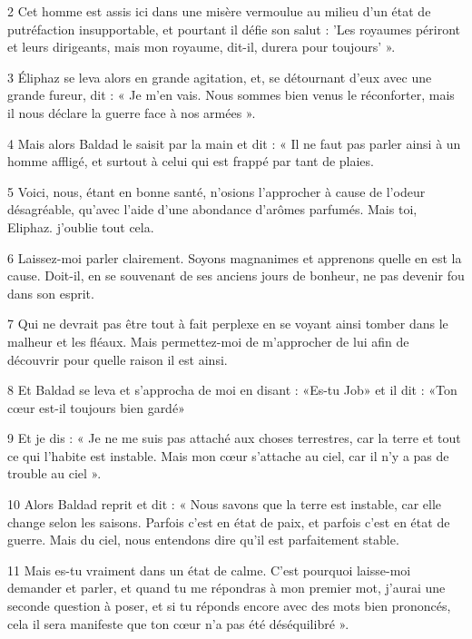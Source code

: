 \par 2 Cet homme est assis ici dans une misère vermoulue au milieu d'un état de putréfaction insupportable, et pourtant il défie son salut : 'Les royaumes périront et leurs dirigeants, mais mon royaume, dit-il, durera pour toujours' ».

\par 3 Éliphaz se leva alors en grande agitation, et, se détournant d'eux avec une grande fureur, dit : « Je m'en vais. Nous sommes bien venus le réconforter, mais il nous déclare la guerre face à nos armées ».

\par 4 Mais alors Baldad le saisit par la main et dit : « Il ne faut pas parler ainsi à un homme affligé, et surtout à celui qui est frappé par tant de plaies.

\par 5 Voici, nous, étant en bonne santé, n'osions l'approcher à cause de l'odeur désagréable, qu'avec l'aide d'une abondance d'arômes parfumés. Mais toi, Eliphaz. j’oublie tout cela.

\par 6 Laissez-moi parler clairement. Soyons magnanimes et apprenons quelle en est la cause. Doit-il, en se souvenant de ses anciens jours de bonheur, ne pas devenir fou dans son esprit.

\par 7 Qui ne devrait pas être tout à fait perplexe en se voyant ainsi tomber dans le malheur et les fléaux. Mais permettez-moi de m'approcher de lui afin de découvrir pour quelle raison il est ainsi.

\par 8 Et Baldad se leva et s'approcha de moi en disant : «Es-tu Job» et il dit : «Ton cœur est-il toujours bien gardé»

\par 9 Et je dis : « Je ne me suis pas attaché aux choses terrestres, car la terre et tout ce qui l'habite est instable. Mais mon cœur s’attache au ciel, car il n’y a pas de trouble au ciel ».

\par 10 Alors Baldad reprit et dit : « Nous savons que la terre est instable, car elle change selon les saisons. Parfois c’est en état de paix, et parfois c’est en état de guerre. Mais du ciel, nous entendons dire qu'il est parfaitement stable.

\par 11 Mais es-tu vraiment dans un état de calme. C'est pourquoi laisse-moi demander et parler, et quand tu me répondras à mon premier mot, j'aurai une seconde question à poser, et si tu réponds encore avec des mots bien prononcés, cela il sera manifeste que ton cœur n’a pas été déséquilibré ».

